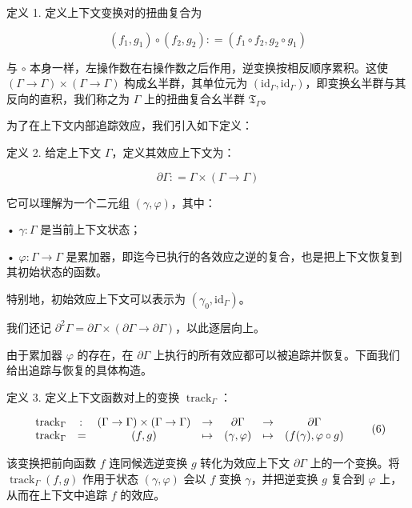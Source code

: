 定义 1. 定义上下文变换对的扭曲复合为

\[
( f _ { 1 } , g _ { 1 } ) \circ ( f _ { 2 } , g _ { 2 } ) : = ( f _ { 1 } \circ f _ { 2 } , g _ { 2 } \circ g _ { 1 } )\tag{4}
\]

与 \(\circ\) 本身一样，左操作数在右操作数之后作用，逆变换按相反顺序累积。这使
\(( \Gamma \to \Gamma ) \times ( \Gamma \to \Gamma )\) 构成幺半群，其单位元为
\(( \mathrm { i d } _ { \Gamma } , \mathrm { i d } _ { \Gamma } )\)，即变换幺半群与其反向的直积，我们称之为 $\Gamma$ 上的扭曲复合幺半群 \(\mathfrak { T } _ { \Gamma }\)。

为了在上下文内部追踪效应，我们引入如下定义：

定义 2. 给定上下文 $\Gamma$，定义其效应上下文为：

\[
\partial \Gamma : = \Gamma \times ( \Gamma \to \Gamma )\tag{5}
\]

它可以理解为一个二元组 \(( \gamma , \varphi )\)，其中：

• \(\gamma : \Gamma\) 是当前上下文状态；

• \(\varphi : \Gamma \to \Gamma\) 是累加器，即迄今已执行的各效应之逆的复合，也是把上下文恢复到其初始状态的函数。

特别地，初始效应上下文可以表示为
\(( \gamma _ { 0 } , \mathrm { i d } _ { \Gamma } )\)。

我们还记
\(\partial ^ { 2 } \Gamma = \partial \Gamma \times ( \partial \Gamma \to \partial \Gamma )\)，以此逐层向上。

由于累加器 \(\varphi\) 的存在，在 \(\partial \Gamma\) 上执行的所有效应都可以被追踪并恢复。下面我们给出追踪与恢复的具体构造。

定义 3. 定义上下文函数对上的变换 \(\operatorname { t r a c k } _ { \Gamma }\)：

\[
\begin{array} { l r c l c l c }
  { \operatorname { t r a c k } _ { \Gamma } } & { \colon } & { ( \Gamma \to \Gamma ) \times ( \Gamma \to \Gamma ) } & { \to } & { \partial \Gamma } & { \to } & { \partial \Gamma } \\
  { \operatorname { t r a c k } _ { \Gamma } } & { = } & { ( f , g ) } & { \mapsto } & { ( \gamma , \varphi ) } & { \mapsto } & { ( f ( \gamma ) , \varphi \circ g ) }
\end{array}\tag{6}
\]

该变换把前向函数 \(f\) 连同候选逆变换 \(g\) 转化为效应上下文 \(\partial \Gamma\) 上的一个变换。将
\(\operatorname { t r a c k } _ { \Gamma } ( f , g )\) 作用于状态 \(( \gamma , \varphi )\) 会以 \(f\) 变换 \(\gamma\)，并把逆变换 \(g\) 复合到 \(\varphi\) 上，从而在上下文中追踪 \(f\) 的效应。

